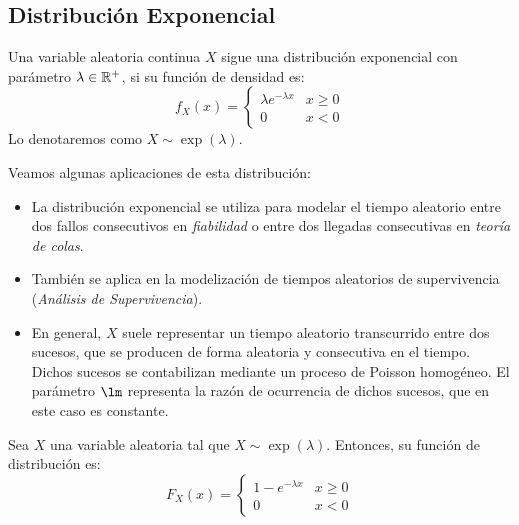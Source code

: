 \subsection{Distribución Exponencial}

\begin{definicion}
    Una variable aleatoria continua $X$ sigue una distribución exponencial con parámetro $\lambda\in \mathbb{R}^+$, si su función de densidad es:
    \begin{equation*}
        f_X(x) = \begin{cases}
            \lambda e^{-\lambda x} & x\geq 0\\
            0 & x<0
        \end{cases}
    \end{equation*}
    Lo denotaremos como $X\sim \exp(\lambda)$.
\end{definicion}
\noindent
Veamos algunas aplicaciones de esta distribución:
\begin{itemize}
    \item La distribución exponencial se utiliza para modelar el tiempo aleatorio entre dos fallos consecutivos en \emph{fiabilidad}
    o entre dos llegadas consecutivas en \emph{teoría de colas}.

    \item También se aplica en la modelización de tiempos aleatorios de supervivencia (\emph{Análisis de Supervivencia}).
    
    \item En general, $X$ suele representar un tiempo aleatorio transcurrido entre dos
    sucesos, que se producen de forma aleatoria y consecutiva en el tiempo.
    Dichos sucesos se contabilizan mediante un proceso de Poisson homogéneo.
    El parámetro $\lm$ representa la razón de ocurrencia de dichos sucesos, que
    en este caso es constante.
\end{itemize}

\begin{prop}
    Sea $X$ una variable aleatoria tal que $X\sim \exp(\lambda)$. Entonces, su función de distribución es:
    \begin{equation*}
        F_X(x) = \begin{cases}
            1-e^{-\lambda x} & x\geq 0\\
            0 & x<0
        \end{cases}
    \end{equation*}
\end{prop}

